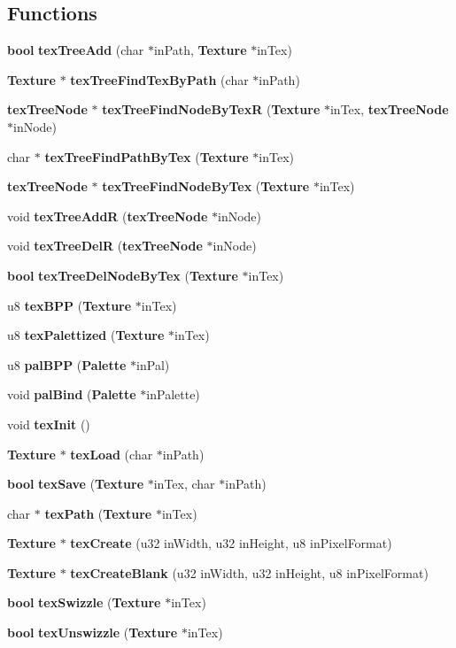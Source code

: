 \subsection*{Functions}
\begin{CompactItemize}
\item 
{\bf bool} {\bf tex\-Tree\-Add} (char $\ast$in\-Path, {\bf Texture} $\ast$in\-Tex)
\item 
{\bf Texture} $\ast$ {\bf tex\-Tree\-Find\-Tex\-By\-Path} (char $\ast$in\-Path)
\item 
{\bf tex\-Tree\-Node} $\ast$ {\bf tex\-Tree\-Find\-Node\-By\-Tex\-R} ({\bf Texture} $\ast$in\-Tex, {\bf tex\-Tree\-Node} $\ast$in\-Node)
\item 
char $\ast$ {\bf tex\-Tree\-Find\-Path\-By\-Tex} ({\bf Texture} $\ast$in\-Tex)
\item 
{\bf tex\-Tree\-Node} $\ast$ {\bf tex\-Tree\-Find\-Node\-By\-Tex} ({\bf Texture} $\ast$in\-Tex)
\item 
void {\bf tex\-Tree\-Add\-R} ({\bf tex\-Tree\-Node} $\ast$in\-Node)
\item 
void {\bf tex\-Tree\-Del\-R} ({\bf tex\-Tree\-Node} $\ast$in\-Node)
\item 
{\bf bool} {\bf tex\-Tree\-Del\-Node\-By\-Tex} ({\bf Texture} $\ast$in\-Tex)
\item 
u8 {\bf tex\-BPP} ({\bf Texture} $\ast$in\-Tex)
\item 
u8 {\bf tex\-Palettized} ({\bf Texture} $\ast$in\-Tex)
\item 
u8 {\bf pal\-BPP} ({\bf Palette} $\ast$in\-Pal)
\item 
void {\bf pal\-Bind} ({\bf Palette} $\ast$in\-Palette)
\item 
void {\bf tex\-Init} ()
\item 
{\bf Texture} $\ast$ {\bf tex\-Load} (char $\ast$in\-Path)
\item 
{\bf bool} {\bf tex\-Save} ({\bf Texture} $\ast$in\-Tex, char $\ast$in\-Path)
\item 
char $\ast$ {\bf tex\-Path} ({\bf Texture} $\ast$in\-Tex)
\item 
{\bf Texture} $\ast$ {\bf tex\-Create} (u32 in\-Width, u32 in\-Height, u8 in\-Pixel\-Format)
\item 
{\bf Texture} $\ast$ {\bf tex\-Create\-Blank} (u32 in\-Width, u32 in\-Height, u8 in\-Pixel\-Format)
\item 
{\bf bool} {\bf tex\-Swizzle} ({\bf Texture} $\ast$in\-Tex)
\item 
{\bf bool} {\bf tex\-Unswizzle} ({\bf Texture} $\ast$in\-Tex)

\end{CompactItemize}
